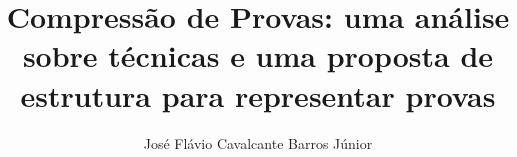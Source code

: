 \documentclass[
  master
  brazilian
]{ThesisPUC}
\author{José Flávio Cavalcante Barros Júnior}
\title{Compressão de Provas: uma análise sobre técnicas e uma proposta de estrutura para representar provas}
\begin{document}
  
  
  
  
  
  
  
  
  \arial
  
  \normalfont
\end{document}
